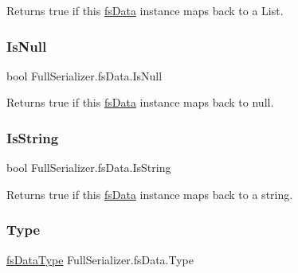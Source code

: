 Returns true if this \hyperlink{class_full_serializer_1_1fs_data}{fs\+Data} instance maps back to a List. 

\mbox{\label{class_full_serializer_1_1fs_data_af434698e3ebdea70932122c1b326c0a8}} 
\subsubsection{\texorpdfstring{Is\+Null}{IsNull}}
{\footnotesize\ttfamily bool Full\+Serializer.\+fs\+Data.\+Is\+Null\hspace{0.3cm}{\ttfamily [get]}}



Returns true if this \hyperlink{class_full_serializer_1_1fs_data}{fs\+Data} instance maps back to null. 

\mbox{\label{class_full_serializer_1_1fs_data_a95589f68382f863386617a0dd4055ae4}} 
\subsubsection{\texorpdfstring{Is\+String}{IsString}}
{\footnotesize\ttfamily bool Full\+Serializer.\+fs\+Data.\+Is\+String\hspace{0.3cm}{\ttfamily [get]}}



Returns true if this \hyperlink{class_full_serializer_1_1fs_data}{fs\+Data} instance maps back to a string. 

\mbox{\label{class_full_serializer_1_1fs_data_a1103886f8029af3fb3e9adef1685072a}} 
\subsubsection{\texorpdfstring{Type}{Type}}
{\footnotesize\ttfamily \hyperlink{namespace_full_serializer_a6eee33d63b94e40fdfcfc59af9fcfc82}{fs\+Data\+Type} Full\+Serializer.\+fs\+Data.\+Type\hspace{0.3cm}{\ttfamily [get]}}



